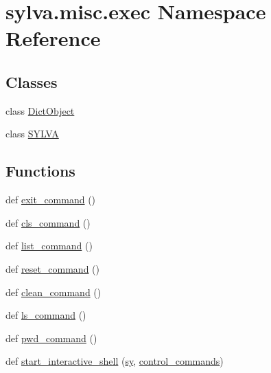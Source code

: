 \hypertarget{namespacesylva_1_1misc_1_1exec}{}\section{sylva.\+misc.\+exec Namespace Reference}
\label{namespacesylva_1_1misc_1_1exec}
\subsection*{Classes}
\begin{DoxyCompactItemize}
\item 
class \hyperlink{classsylva_1_1misc_1_1exec_1_1_dict_object}{Dict\+Object}
\item 
class \hyperlink{classsylva_1_1misc_1_1exec_1_1_s_y_l_v_a}{S\+Y\+L\+VA}
\end{DoxyCompactItemize}
\subsection*{Functions}
\begin{DoxyCompactItemize}
\item 
def \hyperlink{namespacesylva_1_1misc_1_1exec_afdee869cb32b6c18b9747718ac8dc475}{exit\+\_\+command} ()
\item 
def \hyperlink{namespacesylva_1_1misc_1_1exec_aef271c6d1dab8f9f3e66ab76cdecbf42}{cls\+\_\+command} ()
\item 
def \hyperlink{namespacesylva_1_1misc_1_1exec_af0ed98897004764988fba9af76290e90}{list\+\_\+command} ()
\item 
def \hyperlink{namespacesylva_1_1misc_1_1exec_a670ec00a77a111ff274f7d3dc3989966}{reset\+\_\+command} ()
\item 
def \hyperlink{namespacesylva_1_1misc_1_1exec_a57af053cb45645bf285643c3a4f449f4}{clean\+\_\+command} ()
\item 
def \hyperlink{namespacesylva_1_1misc_1_1exec_a2a286b4556ac1dcfb9fa47e672f7bee0}{ls\+\_\+command} ()
\item 
def \hyperlink{namespacesylva_1_1misc_1_1exec_a2ac5cdf0face6797b9b5f2b60e7095e7}{pwd\+\_\+command} ()
\item 
def \hyperlink{namespacesylva_1_1misc_1_1exec_a75779a3eb47b91a0f69020b264c0bd2d}{start\+\_\+interactive\+\_\+shell} (\hyperlink{namespacesylva_1_1misc_1_1exec_a7e1290d4d20b3d0e4d61c95571edda24}{sy}, \hyperlink{namespacesylva_1_1misc_1_1exec_ad240a67608e9c967e361585ab8412a98}{control\+\_\+commands})
\end{DoxyCompactItemize}
